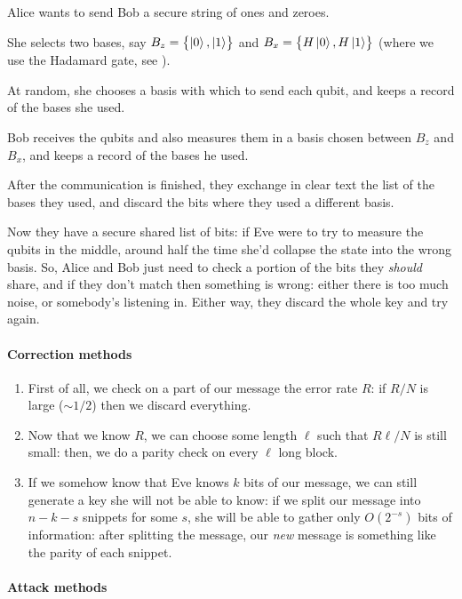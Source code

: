 \documentclass[main.tex]{subfiles}
\begin{document}
Alice wants to send Bob a secure string of ones and zeroes.

She selects two bases, say \(B_z = \qty{\ket{0}, \ket{1}}\) and \(B_x = \qty{H \ket{0}, H \ket{1}  }\) (where we use the Hadamard gate, see ).

At random, she chooses a basis with which to send each qubit, and keeps a record of the bases she used.

Bob receives the qubits and also measures them in a basis chosen between \(B_z\) and \(B_x\), and keeps a record of the bases he used.

After the communication is finished, they exchange in clear text the list of the bases they used, and discard the bits where they used a different basis.

Now they have a secure shared list of bits: if Eve were to try to measure the qubits in the middle, around half the time she'd collapse the state into the wrong basis. So, Alice and Bob just need to check a portion of the bits they \emph{should} share, and if they don't match then something is wrong: either there is too much noise, or somebody's listening in. Either way, they discard the whole key and try again.

\paragraph{Correction methods}

\begin{enumerate}
    \item First of all, we check on a part of our message the error rate \(R\): if \(R/N\) is large (\(\sim 1/2\)) then we discard everything.
    \item Now that we know \(R\),  we can choose some length \(\ell\) such that \(R \ell /N\) is still small: then, we do a parity check on every \(\ell\) long block.
    \item If we somehow know that Eve knows \(k\) bits of our message, we can still generate a key she will not be able to know: if we split our message into \(n-k-s\) snippets for some \(s\), she will be able to gather only \(O(2^{-s})\) bits of information: after splitting the message, our \emph{new} message is something like the parity of each snippet.
\end{enumerate}

\paragraph{Attack methods}
\end{document}
